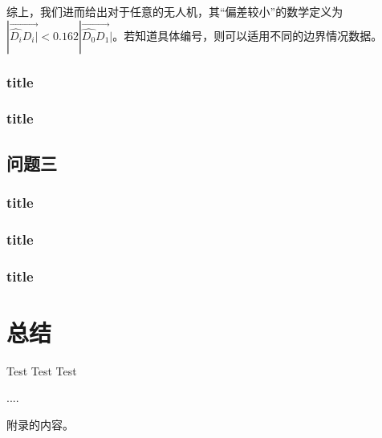\documentclass[withoutpreface,bwprint]{cumcmthesis} %
\begin{document}
			综上，我们进而给出对于任意的无人机，其“偏差较小”的数学定义为$|\overrightarrow{\widehat{D_i}D_i|}<0.162|\overrightarrow{\widehat{D_0}D_1}|$。若知道具体编号，则可以适用不同的边界情况数据。
			\subsubsection{title}
			\subsubsection{title}
		\subsection{问题三}
			\subsubsection{title}
			\subsubsection{title}
			\subsubsection{title}
	\section{总结}
	Test Test Test
	\begin{thebibliography}{9}%
		 ....
	\end{thebibliography}
	\begin{appendices}
		附录的内容。
	\end{appendices}
\end{document}
